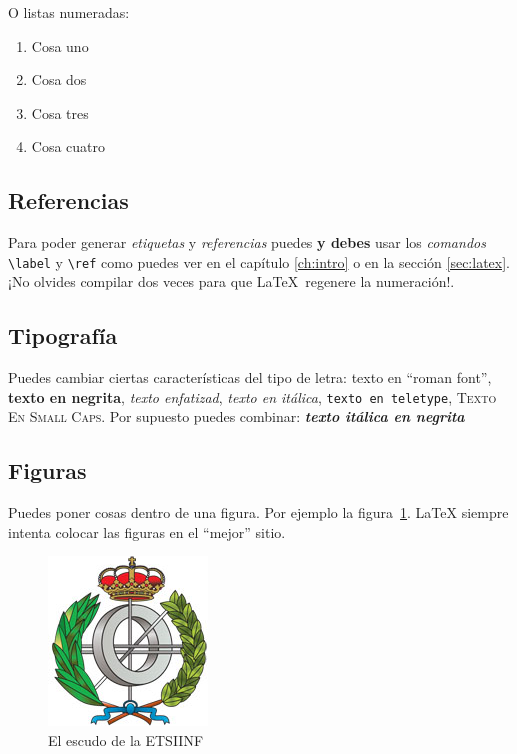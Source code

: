 O listas numeradas:
\begin{enumerate}
\item Cosa uno
\item Cosa dos
\item Cosa tres
\item Cosa cuatro
\end{enumerate}


\subsection{Referencias}

Para poder generar \emph{etiquetas} y \emph{referencias} puedes
\textbf{y debes} usar los \emph{comandos} \verb|\label| y
\verb|\ref| como puedes ver en el capítulo \ref{ch:intro} o en la
sección \ref{sec:latex}. ¡No olvides compilar dos veces para que
\LaTeX\ regenere la numeración!.

\subsection{Tipografía}

Puedes cambiar ciertas características del tipo de letra: \textrm{texto en ``roman font''}, \textbf{texto en negrita}, \emph{texto enfatizad}, \textit{texto en itálica}, \texttt{texto en teletype}, \textsc{Texto En Small Caps}. Por supuesto puedes combinar: \textbf{\textit{texto itálica en negrita}}

\subsection{Figuras}

Puedes poner cosas dentro de una figura. Por ejemplo la
figura~\ref{fig:escudo}. LaTeX siempre intenta colocar las figuras en
el ``mejor'' sitio.

\begin{figure}[h]
  \centering
  \includegraphics[width=0.33\linewidth]{include/escudo_etsiinf}
  \caption{El escudo de la ETSIINF}
  \label{fig:escudo}
\end{figure}

